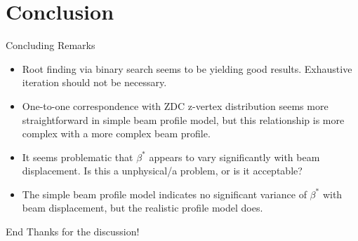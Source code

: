 \section{Conclusion}
\label{ch:Conclusion}

\begin{frame}{Concluding Remarks}
\begin{itemize}
\item Root finding via binary search seems to be yielding good results.
	Exhaustive iteration should not be necessary.
\item One-to-one correspondence with ZDC z-vertex distribution seems more
	straightforward in simple beam profile model, but this relationship is more
	complex with a more complex beam profile.
\item It seems problematic that $\beta^{*}$ appears to vary significantly with
	beam displacement. Is this a unphysical/a problem, or is it acceptable?
\item The simple beam profile model indicates no significant variance of
	$\beta^{*}$ with beam displacement, but the realistic profile model does.
\end{itemize}
\end{frame}

\begin{frame}{End}
Thanks for the discussion!
\end{frame}
